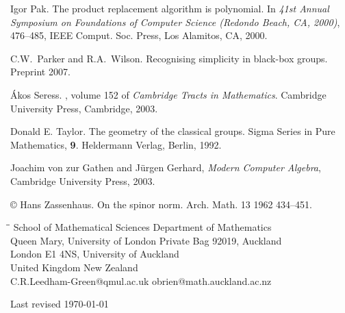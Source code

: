 \documentclass[12pt]{article}
\def\Oh{O}  %
\begin{document}
\begin{thebibliography}{10}
Igor Pak. The product replacement algorithm is polynomial.
In {\it 41st Annual Symposium on Foundations of Computer Science
(Redondo Beach, CA, 2000)}, 476--485,
IEEE Comput. Soc. Press, Los Alamitos, CA, 2000.

C.W.\ Parker and R.A.\ Wilson.
Recognising simplicity in black-box groups. 
Preprint 2007.

{\'A}kos Seress.
, volume 152 of {\em Cambridge
  Tracts in Mathematics}.
\newblock Cambridge University Press, Cambridge, 2003.


Donald E. Taylor. 
The geometry of the classical groups.
Sigma Series in Pure Mathematics, {\bf 9}. Heldermann Verlag, Berlin, 1992. 

Joachim von zur Gathen and J\"urgen Gerhard,
{\it Modern Computer Algebra}, Cambridge University Press, 2003.

©
Hans Zassenhaus. On the spinor norm.  Arch. Math.  13  1962 434--451.
\end{thebibliography}

\begin{tabbing}
\=\hspace{70mm}\=\kill
\>School of Mathematical Sciences \>Department of Mathematics \\
\>Queen Mary, University of London \>Private Bag 92019, Auckland \\
\>London E1 4NS,   \>University of Auckland  \\
\>United Kingdom  \> New Zealand  \\
\> C.R.Leedham-Green@qmul.ac.uk \> obrien@math.auckland.ac.nz
\end{tabbing}

\vspace*{2mm}
\noindent 
Last revised \today
\end{document}
